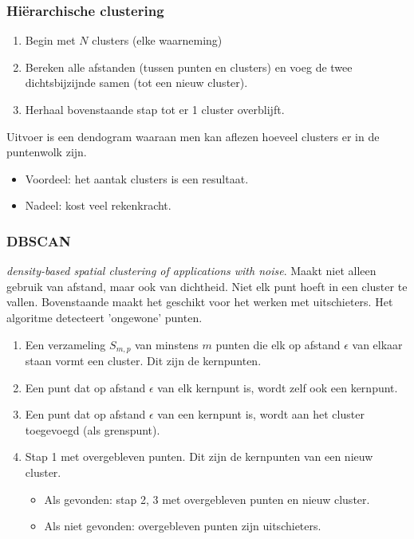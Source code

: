 {\subsubsection{Hiërarchische clustering}
\begin{enumerate}
    \item Begin met $N$ clusters (elke waarneming)
    \item Bereken alle afstanden (tussen punten en clusters) en voeg de twee dichtsbijzijnde samen (tot een nieuw cluster).
    \item Herhaal bovenstaande stap tot er 1 cluster overblijft.
\end{enumerate}
\noindent Uitvoer is een dendogram waaraan men kan aflezen hoeveel clusters er in de puntenwolk zijn.
\begin{itemize}
    \item Voordeel: het aantak clusters is een resultaat.
    \item Nadeel: kost veel rekenkracht.
\end{itemize}
\subsubsection{DBSCAN}
\textit{density-based spatial clustering of applications with noise}. Maakt niet alleen gebruik van afstand, maar ook van dichtheid. Niet elk punt hoeft in een cluster te vallen.
 Bovenstaande maakt het geschikt voor het werken met uitschieters. Het algoritme detecteert 'ongewone' punten.
 \begin{enumerate}
     \item Een verzameling $S_{m,p}$ van minstens $m$ punten die elk op afstand $\epsilon$ van elkaar staan vormt een cluster. Dit zijn de kernpunten.
     \item Een punt dat op afstand $\epsilon$ van elk kernpunt is, wordt zelf ook een kernpunt.
     \item Een punt dat op afstand $\epsilon$ van een kernpunt is, wordt aan het cluster toegevoegd (als grenspunt).
     \item Stap 1 met overgebleven punten. Dit zijn de kernpunten van een nieuw cluster.
     \begin{itemize}
         \item Als gevonden: stap 2, 3 met overgebleven punten en nieuw cluster.
         \item Als niet gevonden: overgebleven punten zijn uitschieters.
     \end{itemize}
 \end{enumerate}

}
